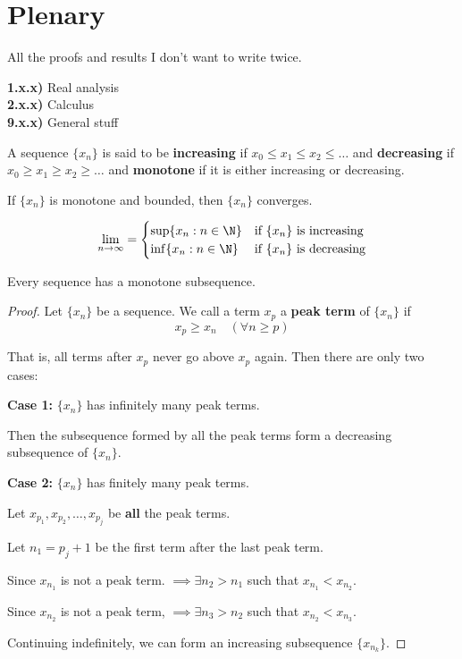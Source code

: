 \section{Plenary}\label{80eeafc}

All the proofs and results I don't want to write twice.

\textbf{1.x.x)} Real analysis \\
\textbf{2.x.x)} Calculus \\
\textbf{9.x.x)} General stuff \\

\label{d5142a8}

A sequence $\{x_n\}$ is said to be \textbf{increasing} if $x_0\leq
	x_1\leq x_2\leq\ldots$ and \textbf{decreasing} if $x_0\geq x_1\geq
	x_2\geq\ldots$ and \textbf{monotone} if it is either increasing or
decreasing.

\label{ca25eb7}

If $\{x_n\}$ is monotone and bounded, then $\{x_n\}$ converges.

$$
	\lim_{n\to\infty}=\begin{cases}
		\sup\{x_n:n\in\N\} & \text{if $\{x_n\}$ is increasing} \\
		\inf\{x_n:n\in\N\} & \text{if $\{x_n\}$ is decreasing}
	\end{cases}
$$

\label{dddb70e}

Every sequence has a monotone subsequence.

\begin{proof}
	\def\xn{\{x_n\}}

	Let $\xn$ be a sequence. We call a term $x_p$ a \textbf{peak term}
	of $\xn$ if
	$$x_p\geq x_n\quad(\forall n\geq p)$$

	That is, all terms after $x_p$ never go above $x_p$ again. Then
	there are only two cases:

	\textbf{Case 1:} $\xn$ has infinitely many peak terms.

	Then the subsequence formed by all the peak terms form a decreasing
	subsequence of $\xn$.

	\textbf{Case 2:} $\xn$ has finitely many peak terms.

	Let $x_{p_1},x_{p_2},\ldots,x_{p_j}$ be \textbf{all} the peak terms.

	Let $n_1=p_j+1$ be the first term after the last peak term.

	Since $x_{n_1}$ is not a peak term. $\implies\exists n_2>n_1$ such
	that $x_{n_1}<x_{n_2}$.

	Since $x_{n_2}$ is not a peak term, $\implies\exists n_3>n_2$ such
	that $x_{n_2}<x_{n_3}$.

	Continuing indefinitely, we can form an increasing subsequence
	$\{x_{n_k}\}$.
\end{proof}

